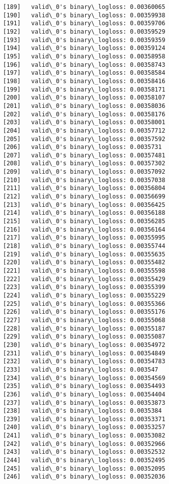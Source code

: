 \documentclass[11pt]{article}
\begin{document}
\begin{Verbatim}[commandchars=\\\{\}]
[189]	valid\_0's binary\_logloss: 0.00360065
[190]	valid\_0's binary\_logloss: 0.00359938
[191]	valid\_0's binary\_logloss: 0.00359706
[192]	valid\_0's binary\_logloss: 0.00359529
[193]	valid\_0's binary\_logloss: 0.00359359
[194]	valid\_0's binary\_logloss: 0.00359124
[195]	valid\_0's binary\_logloss: 0.00358958
[196]	valid\_0's binary\_logloss: 0.00358743
[197]	valid\_0's binary\_logloss: 0.00358584
[198]	valid\_0's binary\_logloss: 0.00358416
[199]	valid\_0's binary\_logloss: 0.00358171
[200]	valid\_0's binary\_logloss: 0.00358107
[201]	valid\_0's binary\_logloss: 0.00358036
[202]	valid\_0's binary\_logloss: 0.00358176
[203]	valid\_0's binary\_logloss: 0.00358001
[204]	valid\_0's binary\_logloss: 0.00357712
[205]	valid\_0's binary\_logloss: 0.00357592
[206]	valid\_0's binary\_logloss: 0.0035731
[207]	valid\_0's binary\_logloss: 0.00357481
[208]	valid\_0's binary\_logloss: 0.00357302
[209]	valid\_0's binary\_logloss: 0.00357092
[210]	valid\_0's binary\_logloss: 0.00357038
[211]	valid\_0's binary\_logloss: 0.00356804
[212]	valid\_0's binary\_logloss: 0.00356699
[213]	valid\_0's binary\_logloss: 0.00356425
[214]	valid\_0's binary\_logloss: 0.00356188
[215]	valid\_0's binary\_logloss: 0.00356285
[216]	valid\_0's binary\_logloss: 0.00356164
[217]	valid\_0's binary\_logloss: 0.00355995
[218]	valid\_0's binary\_logloss: 0.00355744
[219]	valid\_0's binary\_logloss: 0.00355635
[220]	valid\_0's binary\_logloss: 0.00355482
[221]	valid\_0's binary\_logloss: 0.00355598
[222]	valid\_0's binary\_logloss: 0.00355429
[223]	valid\_0's binary\_logloss: 0.00355399
[224]	valid\_0's binary\_logloss: 0.00355229
[225]	valid\_0's binary\_logloss: 0.00355366
[226]	valid\_0's binary\_logloss: 0.00355176
[227]	valid\_0's binary\_logloss: 0.00355068
[228]	valid\_0's binary\_logloss: 0.00355187
[229]	valid\_0's binary\_logloss: 0.00355087
[230]	valid\_0's binary\_logloss: 0.00354972
[231]	valid\_0's binary\_logloss: 0.00354849
[232]	valid\_0's binary\_logloss: 0.00354783
[233]	valid\_0's binary\_logloss: 0.003547
[234]	valid\_0's binary\_logloss: 0.00354569
[235]	valid\_0's binary\_logloss: 0.00354493
[236]	valid\_0's binary\_logloss: 0.00354404
[237]	valid\_0's binary\_logloss: 0.00353873
[238]	valid\_0's binary\_logloss: 0.0035384
[239]	valid\_0's binary\_logloss: 0.00353371
[240]	valid\_0's binary\_logloss: 0.00353257
[241]	valid\_0's binary\_logloss: 0.00353082
[242]	valid\_0's binary\_logloss: 0.00352966
[243]	valid\_0's binary\_logloss: 0.00352532
[244]	valid\_0's binary\_logloss: 0.00352495
[245]	valid\_0's binary\_logloss: 0.00352095
[246]	valid\_0's binary\_logloss: 0.00352036

\end{Verbatim}
\end{document}

